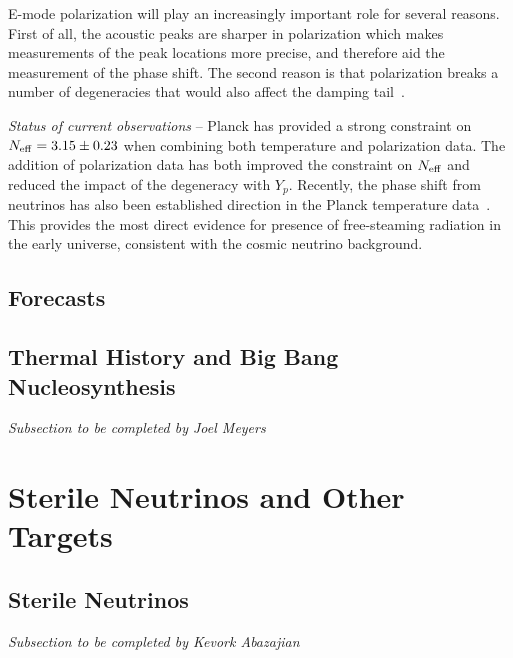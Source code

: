 E-mode polarization will play an increasingly important role for several reasons.  First of all, the acoustic peaks are sharper in polarization which makes measurements of the peak locations more precise, and therefore aid the measurement of the phase shift.  The second reason is that polarization breaks a number of degeneracies that would also affect the damping tail~\cite{Baumann:2015rya}.

{\it Status of current observations} -- Planck has provided a strong constraint on $N_{\rm eff} = 3.15 \pm 0.23$ when combining both temperature and polarization data.  The addition of polarization data has both improved the constraint on $N_{\rm eff}$ and reduced the impact of the degeneracy with $Y_p$.  Recently, the phase shift from neutrinos has also been established direction in the Planck temperature data~\cite{Follin:2015hya}.  This provides the most direct evidence for presence of free-steaming radiation in the early universe, consistent with the cosmic neutrino background.


\subsection{Forecasts}

\subsection{Thermal History and Big Bang Nucleosynthesis}

{\it Subsection to be completed by Joel Meyers}



\section{Sterile Neutrinos and Other Targets}
\subsection{Sterile Neutrinos}

{\it Subsection to be completed by Kevork Abazajian}

